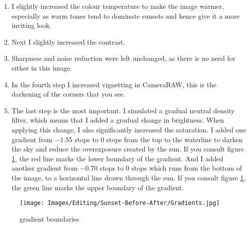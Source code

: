 \begin{enumerate}
	\item I slightly increased the colour temperature to make the image warmer, especially as warm tones tend to dominate sunsets and hence give it a more inviting look.
	\item Next I slightly increased the contrast.
	\item Sharpness and noise reduction were left unchanged, as there is no need for either in this image.
	\item In the fourth step I increased vignetting in CameraRAW, this is the darkening of the corners that you see.
	\item The last step is the most important. I simulated a gradual neutral density filter, which means that I added a gradual change in brightness. When applying this change, I also significantly increased the saturation.
	\subitem I added one gradient from $-1.55$ stops to $0$ stops from the top to the waterline to darken the sky and reduce the overexposure created by the sun. If you consult figure \ref{fig:Gradients}, the red line marks the lower boundary of the gradient.
	\subitem And I added another gradient from $-0.70$ stops to $0$ stops which runs from the bottom of the image, to a horizontal line drawn through the sun. If you consult figure \ref{fig:Gradients}, the green line marks the upper boundary of the gradient.
\end{enumerate}

\begin{figure}[htb]
	\centering
		\texttt{[image: Images/Editing/Sunset-Before-After/Gradients.jpg]}
	\caption{gradient boundaries}
	\label{fig:Gradients}
\end{figure}
